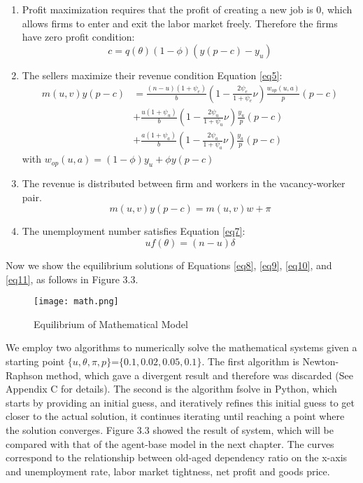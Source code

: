 \documentclass[ %
    final,
    scrbook,
    listoffigures,
    listoftables, 
    glossary]{cu-thesis}
\begin{document}
\begin{enumerate}
   \item Profit maximization requires that the profit of creating a new job is $0$, which allows firms to enter and exit the labor market freely. Therefore the firms have zero profit condition:
   \begin{equation}\label{eq8}
   c = q(\theta)(1-\phi)(y(p-c)-y_u)
   \end{equation}

   \item The sellers maximize their revenue condition Equation \ref{eq5}:
   \begin{equation} \label{eq9}
\begin{split}
m(u,v)y(p-c)&= \frac{(n-u)(1+\psi_e)}{b}(1-\frac{2\psi_e}{1+\psi_e}\nu)\frac{w_{op}(u,a)}{p}(p-c)\\
&+\frac{u(1+\psi_u)}{b}(1-\frac{2\psi_u}{1+\psi_u}\nu)\frac{y_u}{p}(p-c)\\
&+\frac{a(1+\psi_a)}{b}(1-\frac{2\psi_a}{1+\psi_a}\nu)\frac{y_a}{p}(p-c)
\end{split}
\end{equation}
with $w_{op}(u,a)=(1-\phi)y_u+\phi y(p-c)$
   \item The revenue is distributed between firm and workers in the vacancy-worker pair.
   \begin{equation} \label{eq10}
   m(u,v)y(p-c) = m(u,v)w+\pi
   \end{equation}
   \item The unemployment number satisfies Equation \ref{eq7}:
   \begin{equation}\label{eq11}
   uf(\theta) = (n-u)\delta    
   \end{equation}
\end{enumerate}


Now we show the equilibrium solutions of Equations \ref{eq8}, \ref{eq9}, \ref{eq10}, and \ref{eq11}, as follows in
Figure 3.3. 
\begin{figure}[h]%
\centering
\texttt{[image: math.png]}
\caption{Equilibrium of Mathematical Model}
\label{fig:math}
\end{figure}

We employ two algorithms to numerically solve the mathematical systems given
a starting point $\{u,\theta,\pi,p\}$=$\{0.1, 0.02, 0.05, 0.1\}$. The first algorithm is Newton-Raphson method,
which gave a divergent result and therefore was discarded (See Appendix C for details).
The second is the algorithm fsolve in Python, which starts by providing an initial guess,
and iteratively refines this initial guess to get closer to the actual solution, it continues
iterating until reaching a point where the solution converges. Figure 3.3 showed the result
of system, which will be compared with that of the agent-base model in the next chapter.
The curves correspond to the relationship between old-aged dependency ratio on the x-axis
and unemployment rate, labor market tightness, net profit and goods price.
\end{document}
